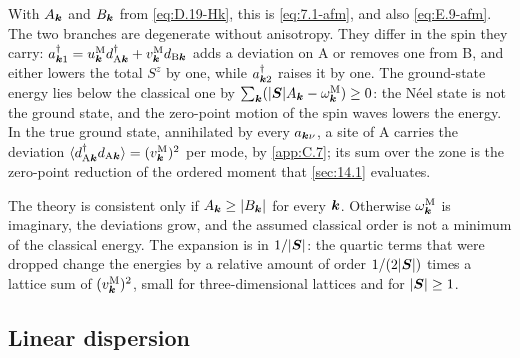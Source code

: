 With $A_{\bm{k}}$ and $B_{\bm{k}}$ from \cref{eq:D.19-Hk}, this is \cref{eq:7.1-afm}, and also \cref{eq:E.9-afm}. The two branches are degenerate without anisotropy. They differ in the spin they carry: $a^\dagger_{\bm{k}1} = u^{\mathrm{M}}_{\bm{k}}d^\dagger_{\mathrm{A}\bm{k}} + v^{\mathrm{M}}_{\bm{k}}d_{\mathrm{B}\bm{k}}$ adds a deviation on A or removes one from B, and either lowers the total $S^z$ by one, while $a^\dagger_{\bm{k}2}$ raises it by one. The ground-state energy lies below the classical one by $\sum_{\bm{k}}(|\bm{S}|A_{\bm{k}} - \omega^{\mathrm{M}}_{\bm{k}}) \ge 0$: the Néel state is not the ground state, and the zero-point motion of the spin waves lowers the energy. In the true ground state, annihilated by every $a_{\bm{k}\nu}$, a site of A carries the deviation $\langle d^\dagger_{\mathrm{A}\bm{k}}d_{\mathrm{A}\bm{k}}\rangle = (v^{\mathrm{M}}_{\bm{k}})^2$ per mode, by \cref{app:C.7}; its sum over the zone is the zero-point reduction of the ordered moment that \cref{sec:14.1} evaluates.

The theory is consistent only if $A_{\bm{k}} \ge |B_{\bm{k}}|$ for every $\bm{k}$. Otherwise $\omega^{\mathrm{M}}_{\bm{k}}$ is imaginary, the deviations grow, and the assumed classical order is not a minimum of the classical energy. The expansion is in $1/|\bm{S}|$: the quartic terms that were dropped change the energies by a relative amount of order $1/(2|\bm{S}|)$ times a lattice sum of $(v^{\mathrm{M}}_{\bm{k}})^2$, small for three-dimensional lattices and for $|\bm{S}| \ge 1$.

\subsection*{Linear dispersion}

